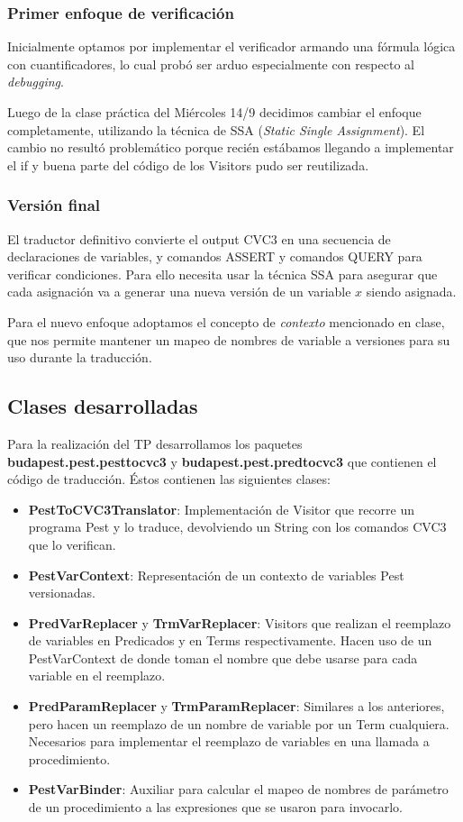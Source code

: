 \documentclass[a4paper]{article}
\begin{document}
\subsubsection{Primer enfoque de verificación}

Inicialmente optamos por implementar el verificador armando una fórmula lógica con cuantificadores, lo cual probó ser arduo especialmente con respecto al \textit{debugging}.

Luego de la clase práctica del Miércoles 14/9 decidimos cambiar el enfoque completamente, utilizando la técnica de SSA (\textit{Static Single Assignment}). El cambio no resultó problemático porque recién estábamos llegando a implementar el if y buena parte del código de los Visitors pudo ser reutilizada.

\subsubsection{Versión final}

El traductor definitivo convierte el output CVC3 en una secuencia de declaraciones de variables, y comandos ASSERT y comandos QUERY para verificar condiciones. Para ello necesita usar la técnica SSA para asegurar que cada asignación va a generar una nueva versión de un variable $x$ siendo asignada.

Para el nuevo enfoque adoptamos el concepto de \textit{contexto} mencionado en clase, que nos permite mantener un mapeo de nombres de variable a versiones para su uso durante la traducción.

\subsection{Clases desarrolladas}

Para la realización del TP desarrollamos los paquetes \textbf{budapest.pest.pesttocvc3} y \textbf{budapest.pest.predtocvc3} que contienen el código de traducción. Éstos contienen las siguientes clases:
\begin{itemize}
\item \textbf{PestToCVC3Translator}: Implementación de Visitor que recorre un programa Pest y lo traduce, devolviendo un String con los comandos CVC3 que lo verifican.
\item \textbf{PestVarContext}: Representación de un contexto de variables Pest versionadas. 
\item \textbf{PredVarReplacer} y \textbf{TrmVarReplacer}: Visitors que realizan el reemplazo de variables en Predicados y en Terms respectivamente. Hacen uso de un PestVarContext de donde toman el nombre que debe usarse para cada variable en el reemplazo.
\item \textbf{PredParamReplacer} y \textbf{TrmParamReplacer}: Similares a los anteriores, pero hacen un reemplazo de un nombre de variable por un Term cualquiera. Necesarios para implementar el reemplazo de variables en una llamada a procedimiento.
\item \textbf{PestVarBinder}: Auxiliar para calcular el mapeo de nombres de parámetro de un procedimiento a las expresiones que se usaron para invocarlo.
\end{itemize}
\end{document}
